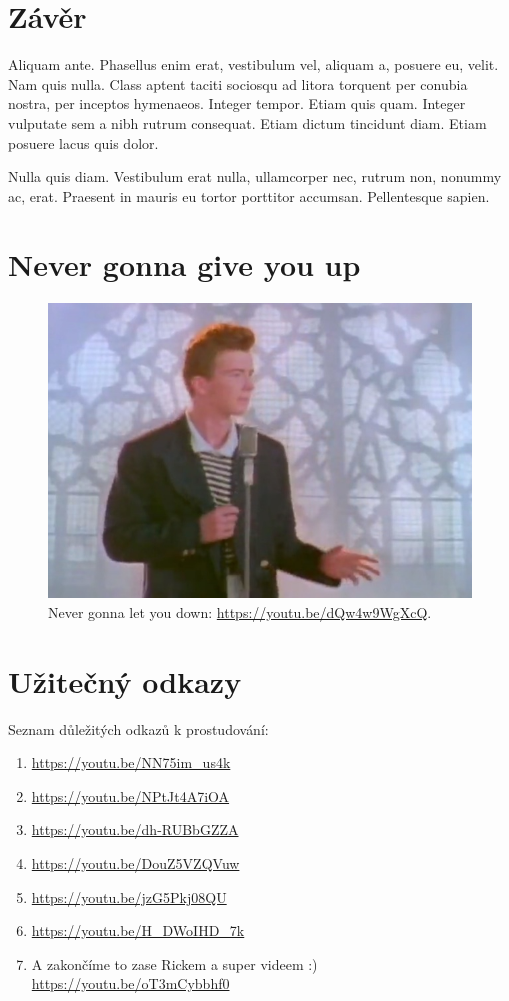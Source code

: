 \documentclass{article}
\begin{document}
\newpage
\section{Závěr}
\par Aliquam ante. Phasellus enim erat, vestibulum vel, aliquam a, posuere eu, velit. Nam quis nulla. Class aptent taciti sociosqu ad litora torquent per conubia nostra, per inceptos hymenaeos. Integer tempor. Etiam quis quam. Integer vulputate sem a nibh rutrum consequat. Etiam dictum tincidunt diam. Etiam posuere lacus quis dolor. 
\par Nulla quis diam. Vestibulum erat nulla, ullamcorper nec, rutrum non, nonummy ac, erat. Praesent in mauris eu tortor porttitor accumsan. Pellentesque sapien.

\newpage
\appendix


\section{Never gonna give you up}
\begin{figure}[H]
	\centerline{\includegraphics[scale=0.5]{./appendices/astley.jpg}}
	\caption{Never gonna let you down: \url{https://youtu.be/dQw4w9WgXcQ}.}
\end{figure}
\section{Užitečný odkazy}
\par Seznam důležitých odkazů k prostudování:\\
\begin{enumerate}
	\item \url{https://youtu.be/NN75im_us4k}
	\item \url{https://youtu.be/NPtJt4A7iOA}
	\item \url{https://youtu.be/dh-RUBbGZZA}
	\item \url{https://youtu.be/DouZ5VZQVuw}
	\item \url{https://youtu.be/jzG5Pkj08QU}
	\item \url{https://youtu.be/H_DWoIHD_7k}
	\item A zakončíme to zase Rickem a super videem :) \url{https://youtu.be/oT3mCybbhf0}
\end{enumerate}
\end{document}
